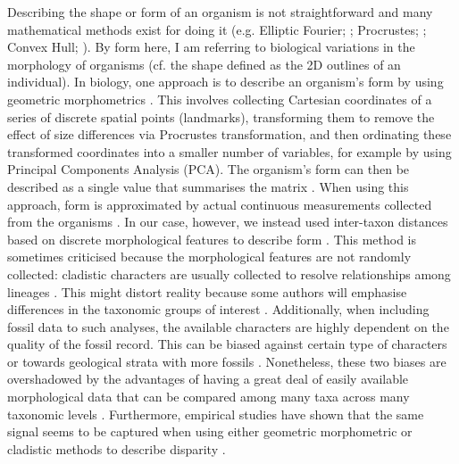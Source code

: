 Describing the shape or form of an organism is not straightforward and many mathematical methods exist for doing it (e.g. Elliptic Fourier; \citealt{Fourier1982}; Procrustes; \citealt{JamesRohlf1993129}; Convex Hull; \citealt{ANDREW1979216}).
By form here, I am referring to biological variations in the morphology of organisms (cf. the shape defined as the 2D outlines of an individual).
In biology, one approach is to describe an organism's form by using geometric morphometrics \citep{zelditch2012geometric}.
This involves collecting Cartesian coordinates of a series of discrete spatial points (landmarks), transforming them to remove the effect of size differences via Procrustes transformation, and then ordinating these transformed coordinates into a smaller number of variables, for example by using Principal Components Analysis (PCA).
The organism's form can then be described as a single value that summarises the matrix \citep[e.g. the sum of the ranges of each PCA axis;][]{zelditch2012geometric}.
When using this approach, form is approximated by actual continuous measurements collected from the organisms \citep[e.g.][]{friedmanexplosive2010,hopkinsdecoupling2013,finlay2015morphological}.
In our case, however, we instead used inter-taxon distances based on discrete morphological features to describe form \citep[i.e. the cladistic disparity method; e.g.][]{foote1997evolution,Wills2001,Wesley-Hunt2005}.
This method is sometimes criticised because the morphological features are not randomly collected: cladistic characters are usually collected to resolve relationships among lineages \citep{O'Leary08022013}.
This might distort reality because some authors will emphasise differences in the taxonomic groups of interest \citep{Hopkins24032015}.
Additionally, when including fossil data to such analyses, the available characters are highly dependent on the quality of the fossil record.
This can be biased against certain type of characters \citep[e.g. soft tissues;][]{sansomfossilization2013} or towards geological strata with more fossils \citep[e.g. \textit{Lagerst\"{a}tten};][]{Butler2012}.
Nonetheless, these two biases are overshadowed by the advantages of having a great deal of easily available morphological data \citep[some morphological matrices have more than 1000 characters; e.g.][]{O'Leary08022013,ni2013oldest} that can be compared among many taxa across many taxonomic levels \citep[e.g. across all mammals;][]{O'Leary08022013,Slater2012MEE,beckancient2014}.
Furthermore, empirical studies have shown that the same signal seems to be captured when using either geometric morphometric or cladistic methods to describe disparity \citep{foth2012different,hetherington2015cladistic}. 

